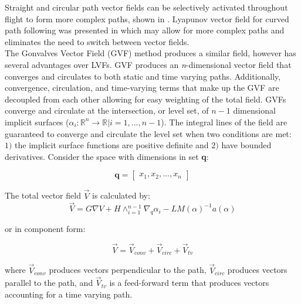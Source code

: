 \documentclass[conf]{new-aiaa}
\begin{document}
Straight and circular path vector fields can be selectively activated throughout flight to form more complex paths, shown in \cite{nelson_cooperative_2005,nelson_vector_2006,nelson_vector_2007,jung_unmanned_2016}. Lyapunov vector field for curved path following was presented in \cite{griffiths_vector_2006} which may allow for more complex paths and eliminates the need to switch between vector fields. \\

The Gonvalves Vector Field (GVF) method produces a similar field, however has several advantages over LVFs. GVF produces an \textit{n}-dimensional vector field that converges and circulates to both static and time varying paths. Additionally, convergence, circulation, and time-varying terms that make up the GVF are decoupled from each other allowing for easy weighting of the total field. GVFs converge and circulate at the intersection, or level set, of $n-1$ dimensional implicit surfaces ($\alpha_i:\mathbb{R}^n\rightarrow\mathbb{R} | i=1,...,n-1$). The integral lines of the field are guaranteed to converge and circulate the level set when two conditions are met: $1)$ the implicit surface functions are positive definite and $2)$ have bounded derivatives. Consider the space with dimensions in set \textbf{q}:



\begin{equation}
\mathbf{q} = \begin{bmatrix} x_1, x_2, ..., x_{n}\end{bmatrix}
\end{equation}

The total vector field $\overrightarrow{V}$ is calculated by:
\begin{equation}\label{eq:GVF}
\overrightarrow{V} = G \nabla V + H \wedge_{i=1}^{n-1}\nabla_q\alpha_i  - LM(\alpha)^{-1} a(\alpha)
\end{equation}

or in component form:

\begin{equation}\label{simpleGVF}
\vec{V} = \vec{V}_{conv} + \vec{V}_{circ} + \vec{V}_{tv} 
\end{equation}	

where $\vec{V}_{conv}$ produces vectors perpendicular to the path, $\vec{V}_{circ}$ produces vectors parallel to the path, and $\vec{V}_{tv}$ is a feed-forward term that produces vectors accounting for a time varying path. 
\end{document}

